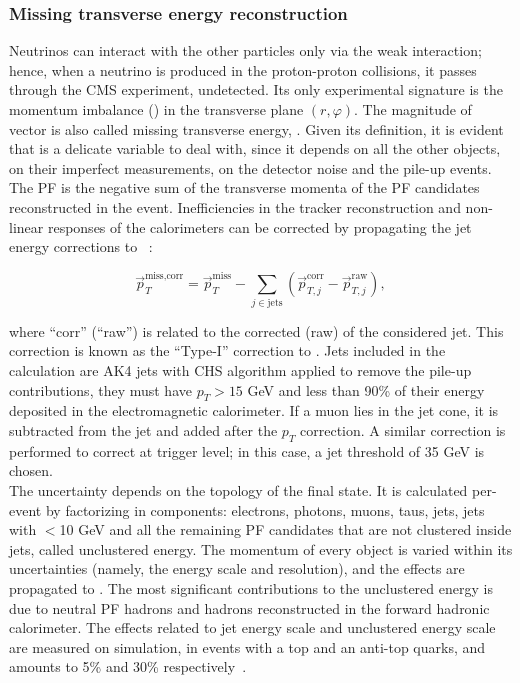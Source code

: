\subsubsection{Missing transverse energy reconstruction}
\label{ssec:met_description}
Neutrinos can interact with the other particles only via the weak interaction; hence, when a neutrino is produced in the proton-proton collisions, it passes through the CMS experiment, undetected. Its only experimental signature is the momentum imbalance (\met) in the transverse plane $(r, \varphi)$. The magnitude of \met vector is also called missing transverse energy, \MET. Given its definition, it is evident that \MET is a delicate variable to deal with, since it depends on all the other objects, on their imperfect measurements, on the detector noise and the pile-up events.\\
The PF \MET is the negative sum of the transverse momenta of the PF candidates reconstructed in the event. Inefficiencies in the tracker reconstruction and non-linear responses of the calorimeters can be corrected by propagating the jet energy corrections to \met~\cite{CMS:2016ljj}:

\begin{equation}
\vec{p}_T^{\text{miss,corr}} = \vec{p}_T^{\text{miss}} - \sum_{j \in \text{jets}} \left( \vec{p}_{T,j}^{\text{corr}} - \vec{p}_{T,j}^{\text{raw}}\right),
\label{eq:met_typeI}
\end{equation}

\noindent where ``corr'' (``raw'') is related to the corrected (raw) \pt of the considered jet. This correction is known as the ``Type-I'' correction to \MET. Jets included in the calculation are AK4 jets with CHS algorithm applied to remove the pile-up contributions, they must have $p_T>15$ GeV and less than 90\% of their energy deposited in the electromagnetic calorimeter. If a muon lies in the jet cone, it is subtracted from the jet and added after the $p_T$ correction. A similar correction is performed to correct \met at trigger level; in this case, a jet \pt threshold of 35 GeV is chosen.\\
The \MET uncertainty depends on the topology of the final state. It is calculated per-event by factorizing \met in components: electrons, photons, muons, taus, jets, jets with \pt$<$10 GeV and all the remaining PF candidates that are not clustered inside jets, called unclustered energy. The momentum of every object is varied within its uncertainties (namely, the energy scale and resolution), and the effects are propagated to \met. The most significant contributions to the unclustered energy is due to neutral PF hadrons and hadrons reconstructed in the forward hadronic calorimeter. The effects related to jet energy scale and unclustered energy scale are measured on simulation, in events with a top and an anti-top quarks, and amounts to 5\% and 30\% respectively~\cite{CMS:2016ljj}.\\

